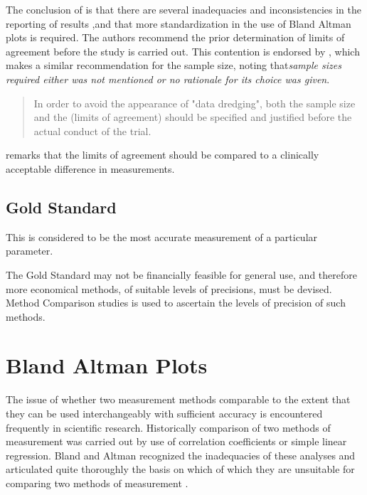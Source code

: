 \documentclass[12pt, a4paper]{report}
\begin{document}
	The conclusion of \citet{mantha} is that there are several
	inadequacies and inconsistencies in the reporting of results ,and
	that more standardization in the use of Bland Altman plots is
	required. The authors recommend the prior determination of limits
	of agreement before the study is carried out. This contention is
	endorsed by \citet{lin}, which makes a similar recommendation for
	the sample size, noting that\emph{sample sizes required either was
		not mentioned or no rationale for its choice was given}.
	
	\begin{quote}
		In order to avoid the appearance of "data dredging", both the
		sample size and the (limits of agreement) should be specified and
		justified before the actual conduct of the trial. \citep{lin}
	\end{quote}
	
	\citet{Dewitte} remarks that the limits of agreement should be
	compared to a clinically acceptable difference in measurements.
	
	
	\subsection{Gold Standard} This is considered to be the most
	accurate measurement of a particular parameter.
	
	The Gold Standard may not be financially feasible for general use, and therefore more economical methods, of suitable levels of precisions, must be devised. Method Comparison studies is used to ascertain the levels of precision of such methods.
	\smallskip
	
	
	\section{Bland Altman Plots}
	The issue of whether two measurement methods comparable to the
	extent that they can be used interchangeably with sufficient
	accuracy is encountered frequently in scientific research.
	Historically comparison of two methods of measurement was carried
	out by use of correlation coefficients or simple linear
	regression. Bland and Altman recognized the inadequacies of these
	analyses and articulated quite thoroughly the basis on which of
	which they are unsuitable for comparing two methods of measurement
	\citep*{BA83}.
	
\end{document}
